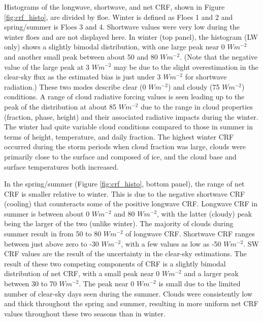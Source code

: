 Histograms of the longwave, shortwave, and net CRF, shown in Figure \ref{fig:crf_histo}, are divided by floe. Winter is defined as Floes 1 and 2 and spring/summer is Floes 3 and 4. Shortwave values were very low during the winter floes and are not displayed here. In winter (top panel), the histogram (LW only) shows a slightly bimodal distribution, with one large peak near 0 $W m^{-2}$ and another small peak between about 50 and 80 $W m^{-2}$. (Note that the negative value of the large peak at 3 $W m^{-2}$ may be due to the slight overestimation in the clear-sky flux as the estimated bias is just under 3 $Wm^{-2}$ for shortwave radiation.) These two modes describe clear (0 $W m^{-2}$) and cloudy (75 $W m^{-2}$) conditions. A range of cloud radiative forcing values is seen leading up to the peak of the distribution at about 85 $W m^{-2}$ due to the range in cloud properties (fraction, phase, height) and their associated radiative impacts during the winter. The winter had quite variable cloud conditions compared to those in summer in terms of height, temperature, and daily fraction. The highest winter CRF occurred during the storm periods when cloud fraction was large, clouds were primarily close to the surface and composed of ice, and the cloud base and surface temperatures both increased.  

In the spring/summer (Figure \ref{fig:crf_histo}, bottom panel), the range of net CRF is smaller relative to winter. This is due to the negative shortwave CRF (cooling) that counteracts some of the positive longwave CRF. Longwave CRF in summer is between about 0 $Wm^{-2}$ and 80 $Wm^{-2}$, with the latter (cloudy) peak being the larger of the two (unlike winter). The majority of clouds during summer result in from 50 to 80 $Wm^{-2}$ of longwave CRF. Shortwave CRF ranges between just above zero to -30 $Wm^{-2}$, with a few values as low as -50 $Wm^{-2}$. SW CRF values are the result of the uncertainty in the clear-sky estimations. The result of these two competing components of CRF is a slightly bimodal distribution of net CRF, with a small peak near 0 $Wm^{-2}$ and a larger peak between 30 to 70 $Wm^{-2}$. The peak near 0 $Wm^{-2}$ is small due to the limited number of clear-sky days seen during the summer. Clouds were consistently low and thick throughout the spring and summer, resulting in more uniform net CRF values throughout these two seasons than in winter.

